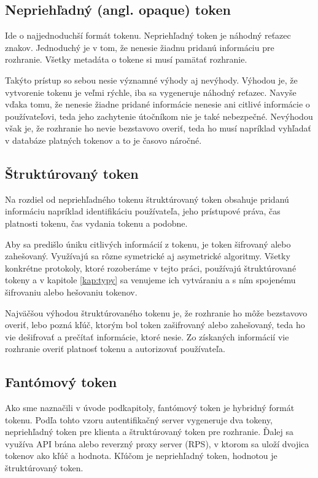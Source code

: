 \subsection{Nepriehľadný (angl. opaque) token}

Ide o najjednoduchší formát tokenu. Nepriehľadný token je náhodný reťazec znakov. Jednoduchý je v tom, že nenesie žiadnu pridanú informáciu pre rozhranie. Všetky metadáta o tokene si musí pamätať rozhranie.

Takýto prístup so sebou nesie významné výhody aj nevýhody. Výhodou je, že vytvorenie tokenu je veľmi rýchle, iba sa vygeneruje náhodný reťazec. Navyše vďaka tomu, že nenesie žiadne pridané informácie nenesie ani citlivé informácie o používateľovi, teda jeho zachytenie útočníkom nie je také nebezpečné. Nevýhodou však je, že rozhranie ho nevie bezstavovo overiť, teda ho musí napríklad vyhľadať v databáze platných tokenov a to je časovo náročné.


\subsection{Štruktúrovaný token}


Na rozdiel od nepriehľadného tokenu štruktúrovaný token obsahuje pridanú informáciu napríklad identifikáciu používateľa, jeho prístupové práva, čas platnosti tokenu, čas vydania tokenu a podobne.

Aby sa predišlo úniku citlivých informácií z tokenu, je token šifrovaný alebo zahešovaný. Využívajú sa rôzne symetrické aj asymetrické algoritmy. Všetky konkrétne protokoly, ktoré rozoberáme v tejto práci, používajú štruktúrované tokeny a v kapitole \ref{kap:typy} sa venujeme ich vytváraniu a s ním spojenému šifrovaniu alebo hešovaniu tokenov.

Najväčšou výhodou štruktúrovaného tokenu je, že rozhranie ho môže bezstavovo overiť, lebo pozná kľúč, ktorým bol token zašifrovaný alebo zahešovaný, teda ho vie dešifrovať a prečítať informácie, ktoré nesie. Zo získaných informácií vie rozhranie overiť platnosť tokenu a autorizovať používateľa.


\subsection{Fantómový token}

Ako sme naznačili v úvode podkapitoly, fantómový token je hybridný formát tokenu. Podľa tohto vzoru autentifikačný server vygeneruje dva tokeny, nepriehľadný token pre klienta a štruktúrovaný token pre rozhranie. Ďalej sa využíva API brána alebo reverzný proxy server (RPS), v ktorom sa uloží dvojica tokenov ako kľúč a hodnota. Kľúčom je nepriehľadný token, hodnotou je štruktúrovaný token.

